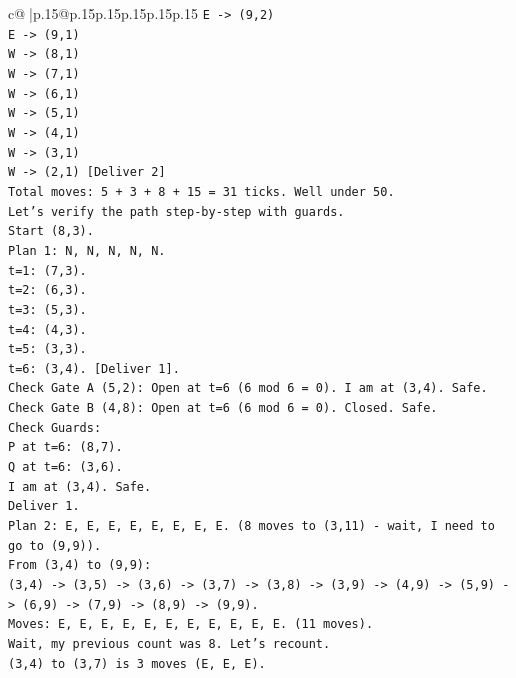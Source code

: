 \documentclass{article}
\begin{document}
{\begin{supertabular}{c@{$\;$}|p{.15\linewidth}@{}p{.15\linewidth}p{.15\linewidth}p{.15\linewidth}p{.15\linewidth}p{.15\linewidth}}
{{{\texttt{E {-}> (9,2)} \\
\texttt{E {-}> (9,1)} \\
\texttt{W {-}> (8,1)} \\
\texttt{W {-}> (7,1)} \\
\texttt{W {-}> (6,1)} \\
\texttt{W {-}> (5,1)} \\
\texttt{W {-}> (4,1)} \\
\texttt{W {-}> (3,1)} \\
\texttt{W {-}> (2,1) {[}Deliver 2{]}} \\
\texttt{Total moves: 5 + 3 + 8 + 15 = 31 ticks. Well under 50.} \\
\texttt{Let's verify the path step{-}by{-}step with guards.} \\
\texttt{Start (8,3).} \\
\texttt{Plan 1: N, N, N, N, N.} \\
\texttt{t=1: (7,3).} \\
\texttt{t=2: (6,3).} \\
\texttt{t=3: (5,3).} \\
\texttt{t=4: (4,3).} \\
\texttt{t=5: (3,3).} \\
\texttt{t=6: (3,4). {[}Deliver 1{]}.} \\
\texttt{Check Gate A (5,2): Open at t=6 (6 mod 6 = 0). I am at (3,4). Safe.} \\
\texttt{Check Gate B (4,8): Open at t=6 (6 mod 6 = 0). Closed. Safe.} \\
\texttt{Check Guards:} \\
\texttt{P at t=6: (8,7).} \\
\texttt{Q at t=6: (3,6).} \\
\texttt{I am at (3,4). Safe.} \\
\texttt{Deliver 1.} \\
\texttt{Plan 2: E, E, E, E, E, E, E, E. (8 moves to (3,11) {-} wait, I need to go to (9,9)).} \\
\texttt{From (3,4) to (9,9):} \\
\texttt{(3,4) {-}> (3,5) {-}> (3,6) {-}> (3,7) {-}> (3,8) {-}> (3,9) {-}> (4,9) {-}> (5,9) {-}> (6,9) {-}> (7,9) {-}> (8,9) {-}> (9,9).} \\
\texttt{Moves: E, E, E, E, E, E, E, E, E, E, E. (11 moves).} \\
\texttt{Wait, my previous count was 8. Let's recount.} \\
\texttt{(3,4) to (3,7) is 3 moves (E, E, E).} \\
}}}
\end{supertabular}}
\end{document}
